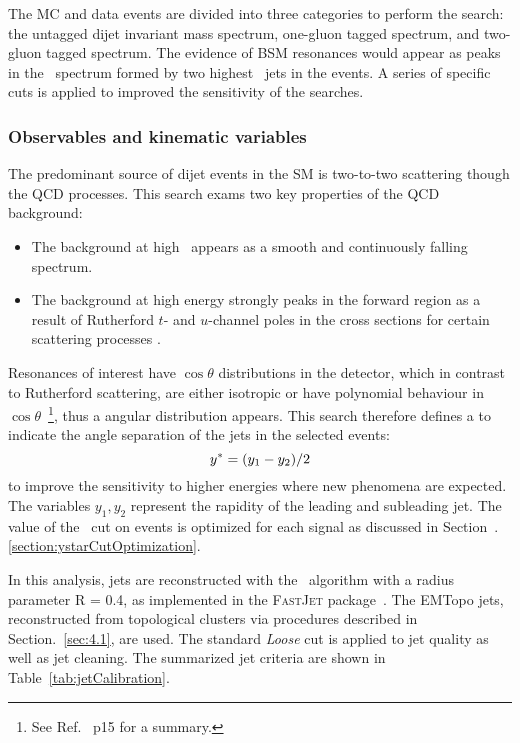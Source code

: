 The MC and data events are divided into three categories to perform the search: the untagged dijet invariant mass spectrum, one-gluon tagged spectrum, and two-gluon tagged spectrum. The evidence of BSM resonances would appear as peaks in the \mjj~spectrum formed by two highest \pt~jets in the events. A series of specific cuts is applied to improved the sensitivity of the searches.


\subsubsection{Observables and kinematic variables}
The predominant source of dijet
events in the SM is two-to-two scattering though the QCD processes. This search exams two key properties of the QCD background:
\begin{itemize}
	\item The background at high \mjj~appears as a smooth and continuously falling spectrum.
	\item The background at high energy strongly peaks in the forward region as a result of Rutherford $t$- and $u$-channel poles in the cross sections
for certain scattering processes \cite{Harris:2011bh}.
\end{itemize}

Resonances of interest have $\cos{\theta}$ distributions in the detector, which in contrast to Rutherford scattering, are either isotropic or have polynomial behaviour in $\cos{\theta}$~\footnote{See Ref.~\cite{Harris:2011bh} p15 for a summary.}, thus a angular distribution appears. This search therefore defines a \ystar to indicate the angle separation of the jets in the selected events:
\begin{equation}
 y^\ast = (y_1-y_2)/2
\end{equation}
to improve the sensitivity to higher energies where new phenomena are expected. The variables $y_1, y_2$ represent the rapidity of the leading and subleading jet. The value of the \ystar\ cut on events is optimized for each signal as discussed in Section~.\ref{section:ystarCutOptimization}.


In this analysis, jets are reconstructed with the \akt~algorithm
with a radius parameter R = 0.4, as implemented in the \textsc{FastJet}
package~\cite{Cacciari:2011ma}.  The EMTopo jets, reconstructed from topological clusters via procedures described in Section.~\ref{sec:4.1}, are used. The standard \textit{Loose} cut is applied to jet quality as well as jet cleaning. The summarized jet criteria are shown in Table~\ref{tab:jetCalibration}.


